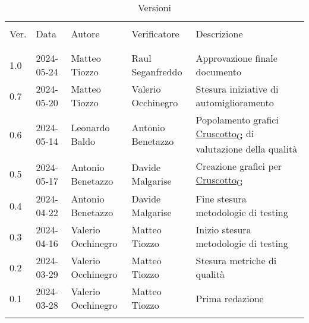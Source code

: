 \documentclass[italian,12pt]{article} %
\begin{document}

\newpage

\captionsetup[table]{list=no}
\begin{table}[!h]
	\caption*{Versioni}
	\footnotesize
	\begin{center}
		\begin{tabular}{ l l l l p{6cm} }
			\hline                                                                                                                   \\[-2ex]
			Ver. & Data       & Autore             & Verificatore       & Descrizione                                                \\
			\\[-2ex] \hline \\[-1.5ex]
			1.0  & 2024-05-24 & Matteo Tiozzo      & Raul Seganfreddo   & Approvazione finale documento                              \\
			0.7  & 2024-05-20 & Matteo Tiozzo      & Valerio Occhinegro & Stesura iniziative di automiglioramento                    \\
			0.6  & 2024-05-14 & Leonardo Baldo     & Antonio Benetazzo  & Popolamento grafici \href{https://7last.github.io/docs/rtb/documentazione-interna/glossario\#cruscotto}{Cruscotto\textsubscript{G}} di valutazione della qualità \\
			0.5  & 2024-05-17 & Antonio Benetazzo  & Davide Malgarise   & Creazione grafici per \href{https://7last.github.io/docs/rtb/documentazione-interna/glossario\#cruscotto}{Cruscotto\textsubscript{G}}                            \\
			0.4  & 2024-04-22 & Antonio Benetazzo  & Davide Malgarise   & Fine stesura metodologie di testing                        \\
			0.3  & 2024-04-16 & Valerio Occhinegro & Matteo Tiozzo      & Inizio stesura metodologie di testing                      \\
			0.2  & 2024-03-29 & Valerio Occhinegro & Matteo Tiozzo      & Stesura metriche di qualità                                \\
			0.1  & 2024-03-28 & Valerio Occhinegro & Matteo Tiozzo      & Prima redazione                                            \\
			\\[-1.5ex] \hline
		\end{tabular}
	\end{center}
\end{table}
\captionsetup[table]{list=yes}
\newpage
\tableofcontents
\listoftables
\listoffigures
\newpage





\end{document}
